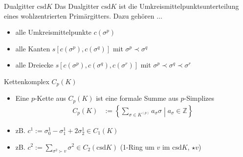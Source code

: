 \documentclass[handout]{beamer}
\newcommand{\Z}{\mathds{Z}}
\newcommand{\csd}{\text{csd}}
\begin{document}
  \begin{frame}
    \begin{block}{Dualgitter \( \csd K \)}
      Das Dualgitter \( \csd K \) ist die Umkreismittelpunktsunterteilung eines wohlzentrierten Primärgitters.
      Dazu gehören \( \ldots \) 
      \begin{itemize}
        \item<2-> alle Umkreismittelpunkte \( c(\sigma^{p}) \)
        \item<3-> alle Kanten \( s[c(\sigma^{p}), c(\sigma^{q})] \) mit \( \sigma^{p}\prec\sigma^{q} \)
        \item<4-> alle Dreiecke \( s[c(\sigma^{p}), c(\sigma^{q}),  c(\sigma^{r})] \) mit \( \sigma^{p}\prec\sigma^{q}\prec\sigma^{r} \)
      \end{itemize}
    \end{block}
      \begin{overprint}
         \centering
         \centering
         \centering
         \centering
         \centering
      \end{overprint}
  \end{frame}

  \begin{frame}
  \small
    \begin{block}{Kettenkomplex \( C_{p}(K) \)}
      \begin{itemize}
        \setlength{\itemsep}{1pt}
        \item<1->  Eine \( p \)-Kette aus \( C_{p}(K) \) ist eine formale Summe aus \( p \)-Simplizes
            \begin{align*}
              C_{p}(K) &:= \left\{\sum_{\sigma\in K^{(p)}}a_{\sigma}\sigma \middle| a_{\sigma}\in\Z \right\}
            \end{align*}
        \item<2-> zB. \( c^{1} := \sigma^{1}_{0} - \sigma^{1}_{1} + 2\sigma^{1}_{2}\in C_{1}(K) \)
        \item<3-> zB. \( c^{2} := \sum_{\sigma^{2}\succ v} \sigma^{2} \in C_{2}(\csd K) \) (1-Ring um \( v \) im \( \csd K \), \( \star v \))
      \end{itemize}
    \end{block}
      \begin{overprint}
         \centering
         \centering
      \end{overprint}
  \end{frame}
\end{document}
